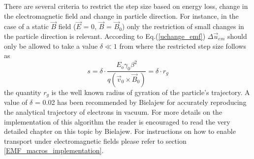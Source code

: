 There are several criteria to restrict the step size based on energy loss, change in the electromagnetic field and change in particle direction. For instance, in the case of a static $\vec{B}$ field ($\vec{E}$ = 0, $\vec{B}$ = $\vec{B}_0$) only the restriction of small changes in the particle direction is relevant. According to Eq.(\ref{uchange_emf}) $\Delta\vec{u}_{em}$ should only be allowed to take a value $\delta \ll 1$ from where the restricted step size follows as
\begin{equation}
\label{uchange_restriction}
  s = \delta \cdot \frac{E_o \gamma_0 \beta^2}{q\left(\vec{v}_0 \times \vec{B}_0\right)} = \delta \cdot r_g
\end{equation}
the quantity $r_g$ is the well known radius of gyration of the particle's trajectory. A value of $\delta$ = 0.02 has been recommended by Bielajew for accurately reproducing the analytical trajectory of electrons in vacuum. For more details on the implementation of this algorithm the reader is encouraged to read the very detailed chapter on this topic by Bielajew\cite{Bi89a}. For instructions on how to enable transport under electromagnetic fields please refer to section \ref{EMF_macros_implementation}.

\newpage


